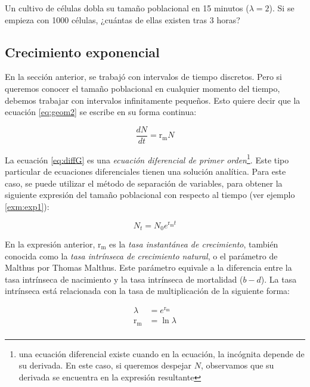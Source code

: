 \documentclass[12pt,letterpaper,]{book}
\let\rmarkdownfootnote\footnote%
\def\footnote{\protect\rmarkdownfootnote}
\let\BeginKnitrBlock\begin \let\EndKnitrBlock\end
\begin{document}
\BeginKnitrBlock{exercise}
\protect\hypertarget{exr:GeomGrowthBacteria2}{}{\label{exr:GeomGrowthBacteria2}
}Un cultivo de células dobla su tamaño poblacional en 15 minutos
(\(\lambda = 2\)). Si se empieza con 1000 células, ¿cuántas de ellas
existen tras 3 horas?
\EndKnitrBlock{exercise}

\subsection{Crecimiento exponencial}\label{crecimiento-exponencial}

En la sección anterior, se trabajó con intervalos de tiempo discretos.
Pero si queremos conocer el tamaño poblacional en cualquier momento del
tiempo, debemos trabajar con intervalos infinitamente pequeños. Esto
quiere decir que la ecuación \eqref{eq:geom2} se escribe en su forma
continua:

\begin{equation}
\frac{dN}{dt}=\mathrm{r_m} N
 \label{eq:diffG}
 \end{equation}

La ecuación \eqref{eq:diffG} es una \emph{ecuación diferencial de primer
orden}\footnote{una ecuación diferencial existe cuando en la ecuación, la incógnita depende de su derivada. En este caso, si queremos despejar $N$, observamos que su derivada se encuentra en la expresión resultante}.
Este tipo particular de ecuaciones diferenciales tienen una solución
analítica. Para este caso, se puede utilizar el método de separación de
variables, para obtener la siguiente expresión del tamaño poblacional
con respecto al tiempo (ver ejemplo \ref{exm:exp1}):

\begin{equation}
N_t=N_0 e^{\mathrm{r_m}t}
\label{eq:expG}
\end{equation}

En la expresión anterior, \(\mathrm{r_m}\) es la \emph{tasa instantánea
de crecimiento}, también
conocida como la \emph{tasa intrínseca de crecimiento natural}, o el
parámetro de Malthus por Thomas Malthus. Este parámetro equivale a la
diferencia entre la tasa intrínseca de nacimiento y la tasa intrínseca
de mortalidad (\(b - d\)). La tasa intrínseca está relacionada con la
tasa de multiplicación de la siguiente forma:

\begin{equation*}
\begin{split}
\lambda &= e^{\mathrm{r_m}}\\
\mathrm{r_m} &= \ln\lambda\\
\end{split}
\end{equation*}
\end{document}
